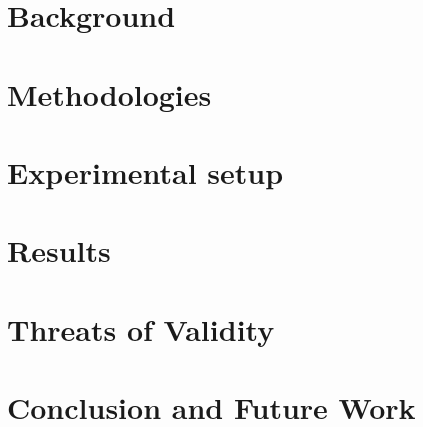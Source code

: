 \documentclass[conference,10pt]{IEEEtran}
\begin{document}
\section{Background}
\label{sec:background}



\section{Methodologies}
\label{sec:method}




\section{Experimental setup}
\label{sec:experiments}





\section{Results}
\label{sec:results}



\section{Threats of Validity}
\label{sec:threats}





\section{Conclusion and Future Work}
\label{sec:conclusion}

% 

\balance


\end{document}
